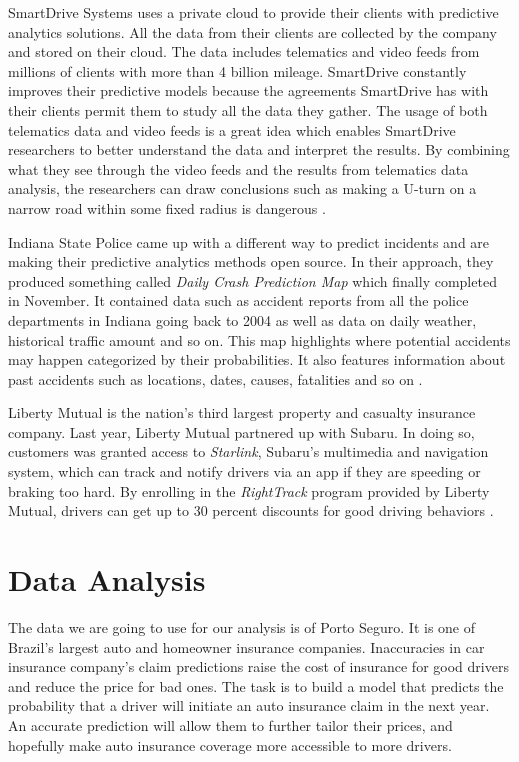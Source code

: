SmartDrive Systems uses a private cloud to provide their clients with predictive analytics solutions. All the data from their clients are collected by the company and stored on their cloud. The data includes telematics and video feeds from millions of clients with more than 4 billion mileage. SmartDrive constantly improves their predictive models because the agreements SmartDrive has with their clients permit them to study all the data they gather. The usage of both telematics data and video feeds is a great idea which enables SmartDrive researchers to better understand the data and interpret the results. By combining what they see through the video feeds and the results from telematics data analysis, the researchers can draw conclusions such as making a U-turn on a narrow road within some fixed radius is dangerous \cite{Banker2016accident}.

Indiana State Police came up with a different way to predict incidents and are making their predictive analytics methods open source. In their approach, they produced something called {\em Daily Crash Prediction Map} which finally completed in November. It contained data such as accident reports from all the police departments in Indiana going back to 2004 as well as data on daily weather, historical traffic amount and so on. This map highlights where potential accidents may happen categorized by their probabilities. It also features information about past accidents such as locations, dates, causes, fatalities and so on \cite{Bergal2017sites}.

Liberty Mutual is the nation's third largest property and casualty insurance company. Last year, Liberty Mutual partnered up with Subaru. In doing so, customers was granted access to {\em Starlink}, Subaru's multimedia and navigation system, which can track and notify drivers via an app if they are speeding or braking too hard. By enrolling in the {\em RightTrack} program provided by Liberty Mutual, drivers can get up to 30 percent discounts for good driving behaviors \cite{Fung2016turn}. 

\section{Data Analysis}
The data we are going to use for our analysis is of Porto Seguro. It is one of Brazil's largest auto and homeowner insurance companies. Inaccuracies in car insurance company's claim predictions raise the cost of insurance for good drivers and reduce the price for bad ones. The task is to build a model that predicts the probability that a driver will initiate an auto insurance claim in the next year. An accurate prediction will allow them to further tailor their prices, and hopefully make auto insurance coverage more accessible to more drivers. 

